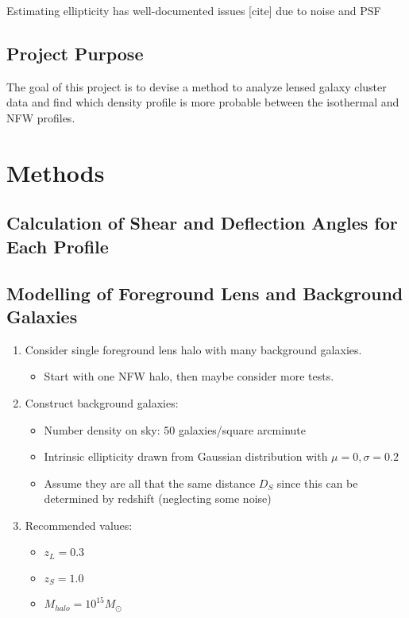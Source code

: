 \documentclass[10pt]{article}
\begin{document}
Estimating ellipticity has well-documented issues [cite] due to noise and PSF

\subsection{Project Purpose}
The goal of this project is to devise a method to analyze lensed galaxy cluster data and find which density profile is more probable between the isothermal and NFW profiles.

\newpage

\section{Methods}
\subsection{Calculation of Shear and Deflection Angles for Each Profile}

\subsection{Modelling of Foreground Lens and Background Galaxies}
\begin{enumerate}
    \item Consider single foreground lens halo with many background galaxies.
    \begin{itemize}
        \item Start with one NFW halo, then maybe consider more tests.
    \end{itemize}
    \item Construct background galaxies:
    \begin{itemize}
        \item Number density on sky: 50 galaxies/square arcminute
        \item Intrinsic ellipticity drawn from Gaussian distribution with $\mu=0, \sigma=0.2$
        \item Assume they are all that the same distance $D_S$ since this can be determined by redshift (neglecting some noise)
    \end{itemize}
    \item Recommended values:
    \begin{itemize}
        \item $z_L = 0.3$
        \item $z_S = 1.0$
        \item $M_{halo} = 10^{15} M_\odot$
    \end{itemize}
\end{enumerate}
\end{document}
